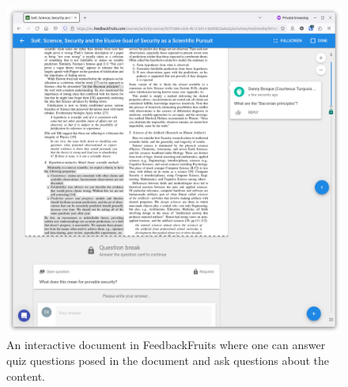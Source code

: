 {\begin{frame}
\begin{columns}
\begin{column}{0.5\columnwidth}
{\begin{figure}
          \includegraphics[width=\columnwidth]{figs/fbf-doc-quiz-question.png}
          \caption{%
            An interactive document in FeedbackFruits where one can answer quiz 
            questions posed in the document and ask questions about the 
            content.%
          }
        \end{figure}
      }
    \end{column}
  \end{columns}
\end{frame}
}


